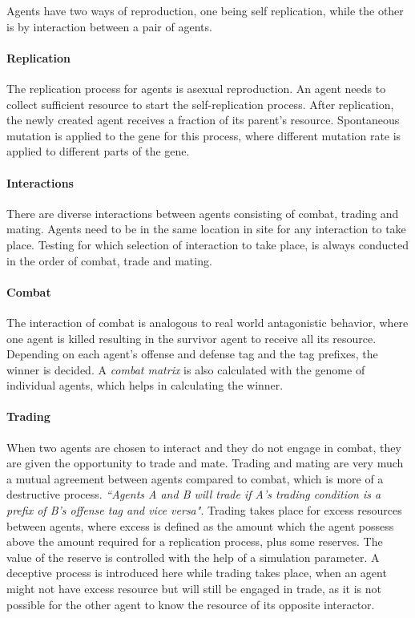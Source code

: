 Agents have two ways of reproduction, one being self replication, while the other is by interaction between a pair of agents. 

\paragraph{Replication}
The replication process for agents is asexual reproduction. An agent needs to collect sufficient resource to start the self-replication process. After replication, the newly created agent receives a fraction of its parent's resource. Spontaneous mutation is applied to the gene for this process, where different mutation rate is applied to different parts of the gene. 

\paragraph{Interactions}
There are diverse interactions between agents consisting of combat, trading and mating. Agents need to be in the same location in site for any interaction to take place. Testing for which selection of interaction to take place, is always conducted in the order of combat, trade and mating.

\paragraph{Combat}
The interaction of combat is analogous to real world antagonistic behavior, where one agent is killed resulting in the survivor agent to receive all its resource. Depending on each agent's offense and defense tag and the tag prefixes, the winner is decided. A \textsl{combat matrix} is also calculated with the genome of individual agents, which helps in calculating the winner.

\paragraph{Trading}
When two agents are chosen to interact and they do not engage in combat, they are given the opportunity to trade and mate. Trading and mating are very much a mutual agreement between agents compared to combat, which is more of a destructive process. \textsl{``Agents A and B will trade if A's trading condition is a prefix of B's offense tag and vice versa"}. Trading takes place for excess resources between agents, where excess is defined as the amount which the agent possess above the amount required for a replication process, plus some reserves. The value of the reserve is controlled with the help of a simulation parameter. A deceptive process is introduced here while trading takes place, when an agent might not have excess resource but will still be engaged in trade, as it is not possible for the other agent to know the resource of its opposite interactor. 

